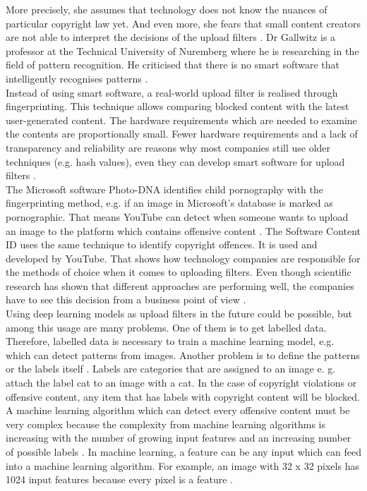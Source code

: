 More precisely, she assumes that technology does not know the nuances of particular copyright law yet. And even more, she fears that small content creators are not able to interpret the decisions of the upload filters \cite{Reda2019}. Dr Gallwitz is a  professor at the Technical University of Nuremberg where he is researching in the field of pattern recognition. He criticised that there is no smart software that intelligently recognises patterns \cite{Gallwitz2019}.\\

Instead of using smart software, a real-world upload filter is realised through fingerprinting. This technique allows comparing blocked content with the latest user-generated content. The hardware requirements which are needed to examine the contents are proportionally small. Fewer hardware requirements and a lack of transparency and reliability are reasons why most companies still use older techniques (e.g. hash values), even they can develop smart software for upload filters \cite{Spoerri2019} \cite{Wagner1983}.\\

The Microsoft software Photo-DNA identifies child pornography with the fingerprinting method, e.g. if an image in Microsoft's database is marked as pornographic. That means YouTube can detect when someone wants to upload an image to the platform which contains offensive content \cite{Microsoft2013}. The Software Content ID uses the same technique to identify copyright offences. It is used and developed by YouTube. That shows how technology companies are responsible for the methods of choice when it comes to uploading filters. Even though scientific research has shown that different approaches are performing well, the companies have to see this decision from a business point of view \cite{YouTube2010}.\\

Using deep learning models as upload filters in the future could be possible, but among this usage are many problems. One of them is to get labelled data. Therefore, labelled data is necessary to train a machine learning model, e.g. which can detect patterns from images. Another problem is to define the patterns or the labels itself \cite{WaltermannHubertus2019}. Labels are categories that are assigned to an image \cite{Goodfellow-et-al-2016} e. g. attach the label cat to an image with a cat. In the case of copyright violations or offensive content, any item that has labels with copyright content will be blocked. A machine learning algorithm which can detect every offensive content must be very complex because the complexity from machine learning algorithms is increasing with the number of growing input features and an increasing number of possible labels \cite{Yao2017}. In machine learning, a feature can be any input which can feed into a machine learning algorithm. For example, an image with 32 x 32 pixels has 1024 input features because every pixel is a feature \cite{Goodfellow-et-al-2016}.

